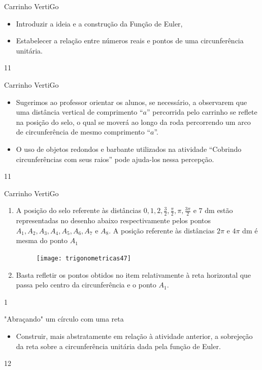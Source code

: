 \cleardoublepage
\def\currentcolor{session1}
\begin{objectives}{Carrinho VertiGo}
{
\begin{itemize}
\item Introduzir a ideia e a construção da Função de Euler,
\item Estabelecer a relação entre números reais e pontos de uma circunferência unitária.
\end{itemize}
}{1}{1}
\end{objectives}
\begin{sugestions}{Carrinho VertiGo}
{
\begin{itemize}
\item Sugerimos ao professor orientar os alunos, se necessário, a observarem que uma distância vertical de comprimento “$a$”{} percorrida pelo carrinho se reflete na posição do selo, o qual se moverá ao longo da roda percorrendo um arco de circunferência de mesmo comprimento “$a$”.
\item  O uso de objetos redondos e barbante utilizados na atividade “Cobrindo circunferências com seus raios”{} pode ajuda-los nessa percepção.
\end{itemize}
}{1}{1}
\end{sugestions}
\clearmargin
\marginpar{\vspace{.5em}}
\begin{answer}{Carrinho VertiGo}
{
 \begin{enumerate}
 \item A posição do selo referente às distâncias $0, 1, 2, \frac{3}{2}, \frac{\pi}{2}, \pi, \frac{3\pi}{2}$ e $7$ dm estão representadas  no desenho abaixo respectivamente pelos pontos $A_1, A_2, A_3, A_4, A_5, A_6, A_7\text{ e }A_8$. A posição referente às distâncias $2\pi$ e $4\pi$ dm é mesma do ponto $A_1$

 \begin{figure}[H]
 \centering
 
 \texttt{[image: trigonometricas47]}
 \end{figure}
 \item Basta refletir os pontos obtidos no item  relativamente à reta horizontal que passa pelo centro da circunferência e o ponto $A_1$.
 \end{enumerate}
}{1}
\end{answer}
\begin{objectives}{"Abraçando"{} um círculo com uma reta}
{
\begin{itemize}
\item Construir, mais abstratamente em relação à atividade anterior, a sobrejeção da reta sobre a circunferência unitária dada pela função de Euler.
\end{itemize}
}{1}{2}
\end{objectives}

